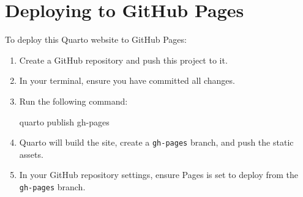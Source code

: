 \documentclass[
]{report}
\author{}
\date{}
\newenvironment{Shaded}{\begin{snugshade}}{\end{snugshade}}
\newcommand{\ExtensionTok}[1]{\textcolor[rgb]{0.00,0.23,0.31}{#1}}
\newcommand{\NormalTok}[1]{\textcolor[rgb]{0.00,0.23,0.31}{#1}}
\renewcommand*\contentsname{Table of contents}
\newcommand\contentsname{Table of contents}
\begin{document}
\renewcommand*\contentsname{Table of contents}
{
\hypersetup{linkcolor=}
\setcounter{tocdepth}{2}
\tableofcontents
}

\chapter{Deploying to GitHub Pages}\label{deploying-to-github-pages}

To deploy this Quarto website to GitHub Pages:

\begin{enumerate}
\def\labelenumi{\arabic{enumi}.}
\item
  Create a GitHub repository and push this project to it.
\item
  In your terminal, ensure you have committed all changes.
\item
  Run the following command:

\begin{Shaded}
\begin{Highlighting}[]
\ExtensionTok{quarto}\NormalTok{ publish gh{-}pages}
\end{Highlighting}
\end{Shaded}
\item
  Quarto will build the site, create a \texttt{gh-pages} branch, and
  push the static assets.
\item
  In your GitHub repository settings, ensure Pages is set to deploy from
  the \texttt{gh-pages} branch.
\end{enumerate}
\end{document}
